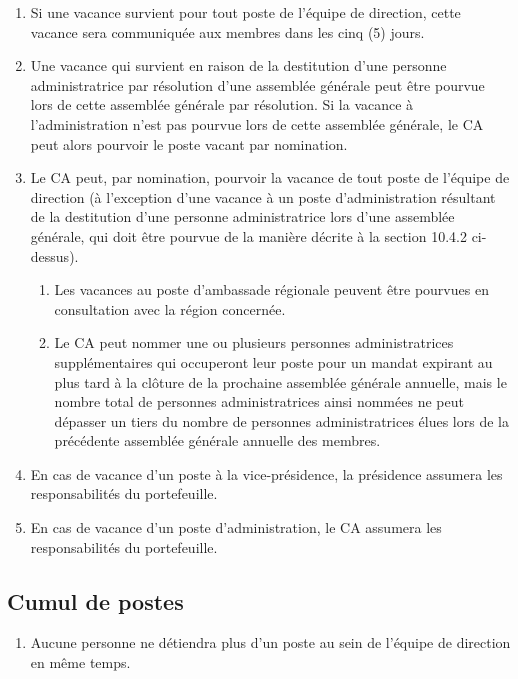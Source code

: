 \begin{enumerate}
 \item Si une vacance survient pour tout poste de l'équipe de direction, cette vacance sera communiquée aux membres dans les cinq (5) jours.
 \item Une vacance qui survient en raison de la destitution d'une personne administratrice par résolution d'une assemblée générale peut être pourvue lors de cette assemblée générale par résolution. Si la vacance à l'administration n'est pas pourvue lors de cette assemblée générale, le CA peut alors pourvoir le poste vacant par nomination.
 \item Le CA peut, par nomination, pourvoir la vacance de tout poste de l'équipe de direction (à l'exception d'une vacance à un poste d'administration résultant de la destitution d'une personne administratrice lors d'une assemblée générale, qui doit être pourvue de la manière décrite à la section 10.4.2 ci-dessus).
  \begin{enumerate}
   \item Les vacances au poste d'ambassade régionale peuvent être pourvues en consultation avec la région concernée.
   \item Le CA peut nommer une ou plusieurs personnes administratrices supplémentaires qui occuperont leur poste pour un mandat expirant au plus tard à la clôture de la prochaine assemblée générale annuelle, mais le nombre total de personnes administratrices ainsi nommées ne peut dépasser un tiers du nombre de personnes administratrices élues lors de la précédente assemblée générale annuelle des membres.
  \end{enumerate}
 \item En cas de vacance d'un poste à la vice-présidence, la présidence assumera les responsabilités du portefeuille.
 \item En cas de vacance d'un poste d'administration, le CA assumera les responsabilités du portefeuille.
\end{enumerate}

\subsection{Cumul de postes}
\label{equipe-de-direction-cumul-de-postes}

\begin{enumerate}
 \item Aucune personne ne détiendra plus d'un poste au sein de l'équipe de direction en même temps.
\end{enumerate}

